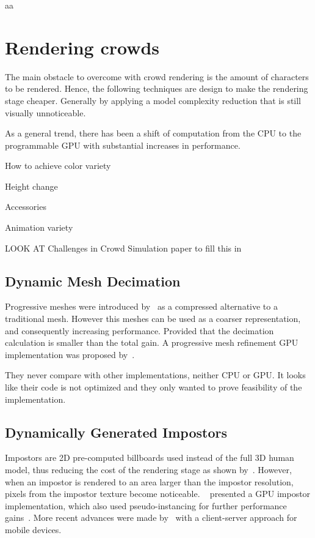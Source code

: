 \documentclass[11pt,twocolumn]{article}
\numberwithin{equation}{section} %
\numberwithin{figure}{section} %
\numberwithin{table}{section} %
\begin{document}
aa

\section{Rendering crowds}

The main obstacle to overcome with crowd rendering is the amount of characters to be rendered.
Hence, the following techniques are design to make the rendering stage cheaper.
Generally by applying a model complexity reduction that is still visually unnoticeable.

As a general trend, there has been a shift of computation from the CPU to the programmable GPU with substantial increases in performance.

How to achieve color variety

Height change

Accessories 

Animation variety

LOOK AT Challenges in Crowd Simulation paper to fill this in

\subsection{Dynamic Mesh Decimation}

Progressive meshes were introduced by~\cite{Hoppe1996} as a compressed alternative to a traditional mesh.
However this meshes can be used as a coarser representation, and consequently increasing performance.
Provided that the decimation calculation is smaller than the total gain.
A progressive mesh refinement GPU implementation was proposed by~\cite{Hu2009}.

They never compare with other implementations, neither CPU or GPU.
It looks like their code is not optimized and they only wanted to prove feasibility of the implementation. 

\subsection{Dynamically Generated Impostors}

Impostors are 2D pre-computed billboards used instead of the full 3D human model, thus reducing the cost of the rendering stage as shown by~\cite{Aubel2000}.
However, when an impostor is rendered to an area larger than the impostor resolution, pixels from the impostor texture become noticeable.
~\cite{Millan2006} presented a GPU impostor implementation, which also used pseudo-instancing for further performance gains~\cite{zelsnack2004glsl}.
More recent advances were made by~\cite{Ghiletiuc2013} with a client-server approach for mobile devices.
\end{document}
